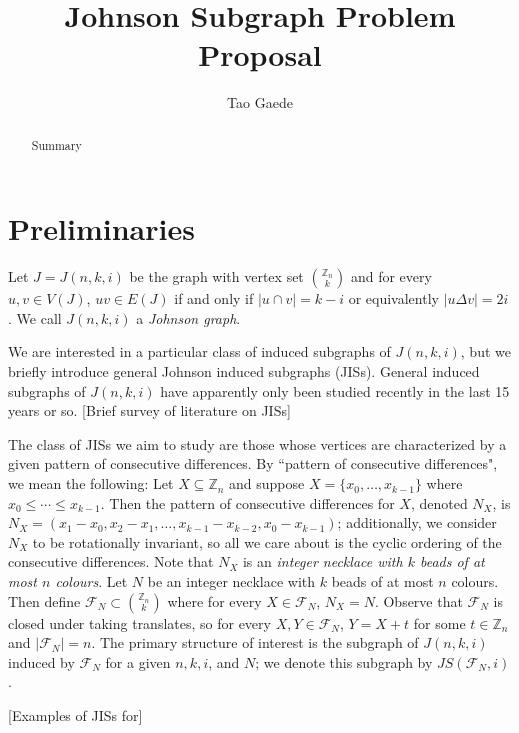 \documentclass[12]{article}
\title{ \vspace{-3cm} Johnson Subgraph Problem Proposal }
\author{Tao Gaede}
\newcommand{\Z}{\mathbb{Z}}
\theoremstyle{definition}
\begin{document}
	\maketitle
	
	\begin{abstract}
		Summary
	\end{abstract}

	\section{Preliminaries}
	Let $J = J(n,k,i)$ be the graph with vertex set ${\Z_n \choose k}$ and for every $u,v \in V(J)$, $uv \in E(J)$ if and only if $|u \cap v| = k-i$ or equivalently $|u \Delta v| = 2i$.  We call $J(n,k,i)$ a \emph{Johnson graph}.
	
	We are interested in a particular class of induced subgraphs of $J(n,k,i)$, but we briefly introduce general Johnson induced subgraphs (JISs).  General induced subgraphs of $J(n,k,i)$ have apparently only been studied recently in the last 15 years or so. [Brief survey of literature on JISs]
	
	The class of JISs we aim to study are those whose vertices are characterized by a given pattern of consecutive differences.  By ``pattern of consecutive differences", we mean the following: Let $X \subseteq \Z_n$ and suppose $X = \{x_0,\ldots,x_{k-1}\}$ where $x_0 \leq \cdots \leq x_{k-1}$.  Then the pattern of consecutive differences for $X$, denoted $N_X$, is $N_X = (x_1-x_0,x_2-x_1,\ldots,x_{k-1} - x_{k-2}, x_0 - x_{k-1})$; additionally, we consider $N_X$ to be rotationally invariant, so all we care about is the cyclic ordering of the consecutive differences.  Note that $N_X$ is an \emph{integer necklace with $k$ beads of at most $n$ colours}.    Let $N$ be an integer necklace with $k$ beads of at most $n$ colours.  Then define $\mathcal{F}_N \subset {\Z_n \choose k}$ where for every $X \in \mathcal{F}_N$, $N_X = N$.  Observe that $\mathcal{F}_N$ is closed under taking translates, so for every $X,Y \in \mathcal{F}_N$, $Y = X + t$ for some $t \in \Z_n$ and $|\mathcal{F}_N| = n$.  The primary structure of interest is the subgraph of $J(n,k,i)$ induced by $\mathcal{F}_N$ for a given $n,k,i$, and $N$; we denote this subgraph by $JS(\mathcal{F}_N,i)$.
	
	[Examples of JISs for]
	
\end{document}
